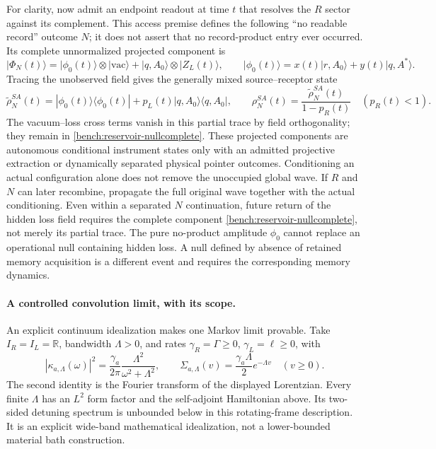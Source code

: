 \documentclass[11pt,oneside,openany]{book}
\theoremstyle{definition}
\theoremstyle{remark}\newtheorem{remark}[theorem]{Remark}
\begin{document}
For clarity, now admit an endpoint readout at time $t$ that resolves the
$R$ sector against its complement. This access premise defines the
following ``no readable record'' outcome $N$; it does not assert that no
record-product entry ever occurred. Its complete unnormalized projected
component is
\begin{equation}
 |\Phi_N(t)\rangle
 =|\phi_0(t)\rangle\otimes|\mathrm{vac}\rangle
       +|q,A_0\rangle\otimes|Z_L(t)\rangle,
 \qquad |\phi_0(t)\rangle=x(t)|r,A_0\rangle+y(t)|q,A^*\rangle.
 \label{bench:reservoir-nullcomplete}
\end{equation}
Tracing the unobserved field gives the generally mixed
source--receptor state
\begin{equation}
 \widetilde\rho_N^{SA}(t)
 =|\phi_0(t)\rangle\langle\phi_0(t)|
       +p_L(t)|q,A_0\rangle\langle q,A_0|,
 \qquad
 \rho_N^{SA}(t)=\frac{\widetilde\rho_N^{SA}(t)}{1-p_R(t)}
 \quad (p_R(t)<1).
 \label{bench:reservoir-nullmixed}
\end{equation}
The vacuum--loss cross terms vanish in this partial trace by field
orthogonality; they remain in \eqref{bench:reservoir-nullcomplete}.
These projected components are autonomous conditional instrument states
only with an admitted projective extraction or dynamically separated
physical pointer outcomes. Conditioning an actual configuration alone
does not remove the unoccupied global wave. If $R$ and $N$ can later
recombine, propagate the full original wave together with the actual
conditioning. Even within a separated $N$ continuation, future return of
the hidden loss field requires the complete component
\eqref{bench:reservoir-nullcomplete}, not merely its partial trace. The
pure no-product amplitude $\phi_0$ cannot replace an operational null
containing hidden loss. A null defined by absence of retained memory
acquisition is a different event and requires the corresponding memory
dynamics.

\paragraph{A controlled convolution limit, with its scope.}
An explicit continuum idealization makes one Markov limit provable.
Take $I_R=I_L=\mathbb R$, bandwidth $\Lambda>0$, and rates
$\gamma_R=\Gamma\ge0$, $\gamma_L=\ell\ge0$, with
\begin{equation}
 |\kappa_{a,\Lambda}(\omega)|^2
   =\frac{\gamma_a}{2\pi}\frac{\Lambda^2}{\omega^2+\Lambda^2},
 \qquad
 \Sigma_{a,\Lambda}(v)=\frac{\gamma_a\Lambda}{2}e^{-\Lambda v}
 \quad(v\ge0).
 \label{bench:reservoir-lorentzian}
\end{equation}
The second identity is the Fourier transform of the displayed
Lorentzian. Every finite $\Lambda$ has an $L^2$ form factor and the
self-adjoint Hamiltonian above. Its two-sided detuning spectrum is
unbounded below in this rotating-frame description. It is an explicit
wide-band mathematical idealization, not a lower-bounded material bath
construction.
\end{document}
